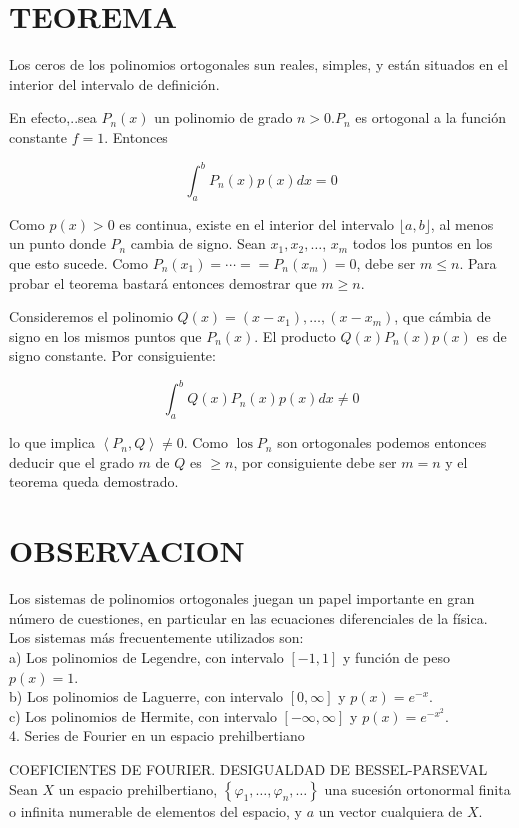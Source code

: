 \documentclass[10pt]{article}
\theoremstyle{plain}
\theoremstyle{definition}
\theoremstyle{remark}
\begin{document}
\section*{TEOREMA}
Los ceros de los polinomios ortogonales sun reales, simples, y están situados en el interior del intervalo de definición.

En efecto,..sea $P_{n}(x)$ un polinomio de grado $n>0 . P_{n}$ es ortogonal a la función constante $f=1$. Entonces

$$
\int_{a}^{b} P_{n}(x) p(x) d x=0
$$

Como $p(x)>0$ es continua, existe en el interior del intervalo $\lfloor a, b\rfloor$, al menos un punto donde $P_{n}$ cambia de signo. Sean $x_{1}, x_{2}, \ldots$, $x_{m}$ todos los puntos en los que esto sucede. Como $P_{n}\left(x_{1}\right)=\cdots= =P_{n}\left(x_{m}\right)=0$, debe ser $m \leqslant n$. Para probar el teorema bastará entonces demostrar que $m \geqslant n$.

Consideremos el polinomio $Q(x)=\left(x-x_{1}\right), \ldots,\left(x-x_{m}\right)$, que cámbia de signo en los mismos puntos que $P_{n}(x)$. El producto $Q(x) P_{n}(x) p(x)$ es de signo constante. Por consiguiente:

$$
\int_{a}^{b} Q(x) P_{n}(x) p(x) d x \neq 0
$$

lo que implica $\left\langle P_{n}, Q\right\rangle \neq 0$. Como $\operatorname{los} P_{n}$ son ortogonales podemos entonces deducir que el grado $m$ de $Q$ es $\geqslant n$, por consiguiente debe ser $m=n$ y el teorema queda demostrado.

\section*{OBSERVACION}
Los sistemas de polinomios ortogonales juegan un papel importante en gran número de cuestiones, en particular en las ecuaciones diferenciales de la física. Los sistemas más frecuentemente utilizados son:\\
a) Los polinomios de Legendre, con intervalo $[-1,1]$ y función de peso $p(x)=1$.\\
b) Los polinomios de Laguerre, con intervalo $[0, \infty]$ y $p(x)=e^{-x}$.\\
c) Los polinomios de Hermite, con intervalo $[-\infty, \infty]$ y $p(x)=e^{-x^{2}}$.\\
4. Series de Fourier en un espacio prehilbertiano

COEFICIENTES DE FOURIER. DESIGUALDAD DE BESSEL-PARSEVAL\\
Sean $X$ un espacio prehilbertiano, $\left\{\varphi_{1}, \ldots, \varphi_{n}, \ldots\right\}$ una sucesión ortonormal finita o infinita numerable de elementos del espacio, y $a$ un vector cualquiera de $X$.
\end{document}
